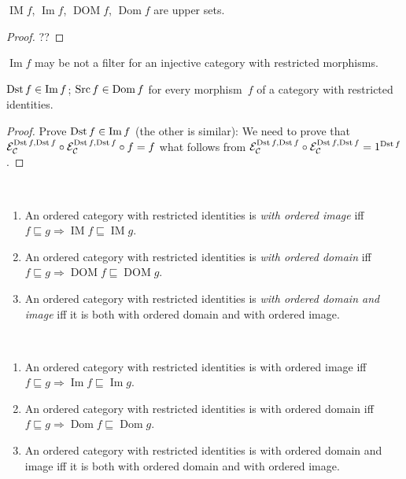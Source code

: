 \begin{prop}
$\operatorname{IM}f$, $\operatorname{Im}f$,
$\operatorname{DOM}f$, $\operatorname{Dom}f$
are upper sets.
\end{prop}

\begin{proof}
??
\end{proof}

\begin{conjecture}
$\operatorname{Im} f$ may be not a filter for an injective
category with restricted morphisms.
\end{conjecture}

\begin{prop}\label{dst-in-im}
$\operatorname{Dst} f\in\operatorname{Im} f$; $\operatorname{Src} f\in\operatorname{Dom} f$ for every morphism~$f$ of a category with restricted
identities.
\end{prop}

\begin{proof}
Prove $\operatorname{Dst} f\in\operatorname{Im} f$ (the other is similar):
We need to prove that $\mathcal{E}_{\mathcal{C}}^{\operatorname{Dst} f, \operatorname{Dst} f} \circ \mathcal{E}_{\mathcal{C}}^{\operatorname{Dst} f,
\operatorname{Dst} f} \circ f = f$ what follows from
$\mathcal{E}_{\mathcal{C}}^{\operatorname{Dst} f, \operatorname{Dst} f} \circ \mathcal{E}_{\mathcal{C}}^{\operatorname{Dst} f, \operatorname{Dst} f} = 1^{\operatorname{Dst} f}$.
\end{proof}

\begin{defn}
~
\begin{enumerate}
\item An ordered category with restricted identities is
\emph{with ordered image} iff $f\sqsubseteq g\Rightarrow
\operatorname{IM}f\sqsubseteq\operatorname{IM}g$.
\item An ordered category with restricted identities is
\emph{with ordered domain} iff $f\sqsubseteq g\Rightarrow
\operatorname{DOM}f\sqsubseteq\operatorname{DOM}g$.
\item An ordered category with restricted identities is
\emph{with ordered domain and image} iff it is both
with ordered domain and with ordered image.
\end{enumerate}
\end{defn}

\begin{obvious}
~
\begin{enumerate}
\item An ordered category with restricted identities is
with ordered image iff $f\sqsubseteq g\Rightarrow
\operatorname{Im}f\sqsubseteq\operatorname{Im}g$.
\item An ordered category with restricted identities is
with ordered domain iff $f\sqsubseteq g\Rightarrow
\operatorname{Dom}f\sqsubseteq\operatorname{Dom}g$.
\item An ordered category with restricted identities is
with ordered domain and image iff it is both
with ordered domain and with ordered image.
\end{enumerate}
\end{obvious}

